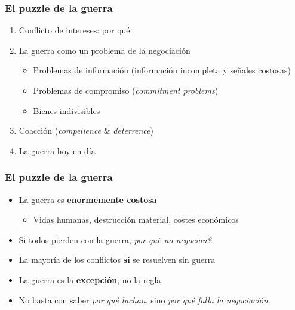 \begin{frame}
\frametitle{El puzzle de la guerra}
\centering

\begin{enumerate}
  \item Conflicto de intereses: por qué
  \item La guerra como un problema de la negociación
  \begin{itemize}
    \item Problemas de información (información incompleta y señales costosas)
    \item Problemas de compromiso (\textit{commitment problems})
    \item Bienes indivisibles
  \end{itemize}
  \item Coacción (\textit{compellence} \& \textit{deterrence})
  \item La guerra hoy en día
\end{enumerate}

\end{frame}


\begin{frame}
\frametitle{El puzzle de la guerra}
\centering

\begin{itemize}
  \item La guerra es \textbf{enormemente costosa}
  \begin{itemize}
    \item Vidas humanas, destrucción material, costes económicos
  \end{itemize}
  \item<2-> Si todos pierden con la guerra, \textit{por qué no negocian?}
  \vspace{8pt}
  \item<3-> La mayoría de los conflictos \textbf{si} se resuelven sin guerra
  \item<3-> La guerra es la \textbf{excepción}, no la regla
  \vspace{8pt}
  \item<4-> No basta con saber \textit{por qué luchan}, sino \textit{por qué falla la negociación}
\end{itemize}

\end{frame}


